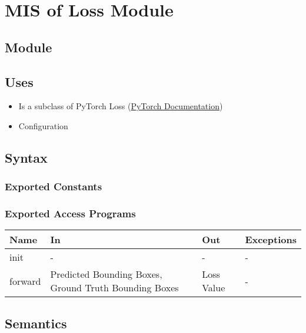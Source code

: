 \documentclass[12pt, titlepage]{article}
\begin{document}
\newpage

\section{MIS of Loss Module} \label{Module} 

\subsection{Module}



\subsection{Uses}

\begin{itemize}
  \item Is a subclass of PyTorch Loss (\href{https://pytorch.org/docs/stable/nn.html#loss-functions}{PyTorch Documentation})
  \item Configuration
\end{itemize}

\subsection{Syntax}



\subsubsection{Exported Constants}



\subsubsection{Exported Access Programs}

\begin{center}
\begin{tabular}{p{2cm}|p{6cm}|p{4cm}|p{2cm}}
\hline
\textbf{Name} & \textbf{In} & \textbf{Out} & \textbf{Exceptions} \\
\hline
init & - & - & - \\
\hline
forward & Predicted Bounding Boxes, Ground Truth Bounding Boxes & Loss Value & - \\
\hline
\end{tabular}
\end{center}

\subsection{Semantics}
\end{document}
